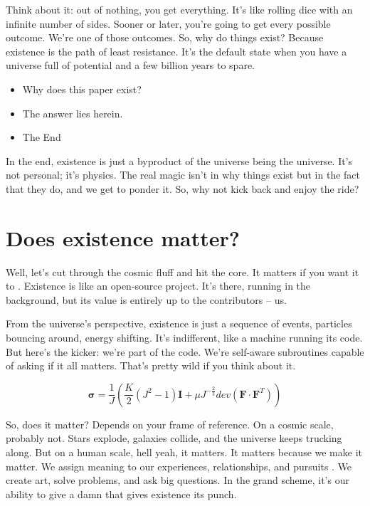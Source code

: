 \documentclass{Axon}
\begin{document}
Think about it: out of nothing, you get everything. It's like rolling dice with an infinite number of sides. Sooner or later, you're going to get every possible outcome. We’re one of those outcomes. So, why do things exist? Because existence is the path of least resistance. It’s the default state when you have a universe full of potential and a few billion years to spare.

\begin{itemize}
    \item Why does this paper exist?
    \item The answer lies herein.
    \item The End
\end{itemize}

In the end, existence is just a byproduct of the universe being the universe. It’s not personal; it’s physics. The real magic isn't in why things exist but in the fact that they do, and we get to ponder it. So, why not kick back and enjoy the ride?
\section{Does existence matter?}
Well, let's cut through the cosmic fluff and hit the core. It matters if you want it to \cite{MALAJETMAROVA2017209}. Existence is like an open-source project. It’s there, running in the background, but its value is entirely up to the contributors – us.

From the universe's perspective, existence is just a sequence of events, particles bouncing around, energy shifting. It’s indifferent, like a machine running its code. But here’s the kicker: we’re part of the code. We’re self-aware subroutines capable of asking if it all matters. That’s pretty wild if you think about it.

\begin{equation}
    \boldsymbol{\sigma} = \frac{1}{J} \left(\frac{K}{2}(J^2-1)\boldsymbol{I}+\mu J^{-\frac{2}{3}} dev(\mathbf{F} \cdot \mathbf{F}^T)\right)
\end{equation}

So, does it matter? Depends on your frame of reference. On a cosmic scale, probably not. Stars explode, galaxies collide, and the universe keeps trucking along. But on a human scale, hell yeah, it matters. It matters because we make it matter. We assign meaning to our experiences, relationships, and pursuits \cite{quantumTomfoolery2024}. We create art, solve problems, and ask big questions. In the grand scheme, it's our ability to give a damn that gives existence its punch.
\end{document}
